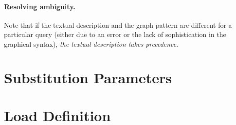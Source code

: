 \paragraph{Resolving ambiguity.} Note that if the textual description and the graph pattern are different for a particular query (either due to an error or the lack of sophistication in the graphical syntax), \emph{the textual description takes precedence}.


\section{Substitution Parameters}




\section{Load Definition}


